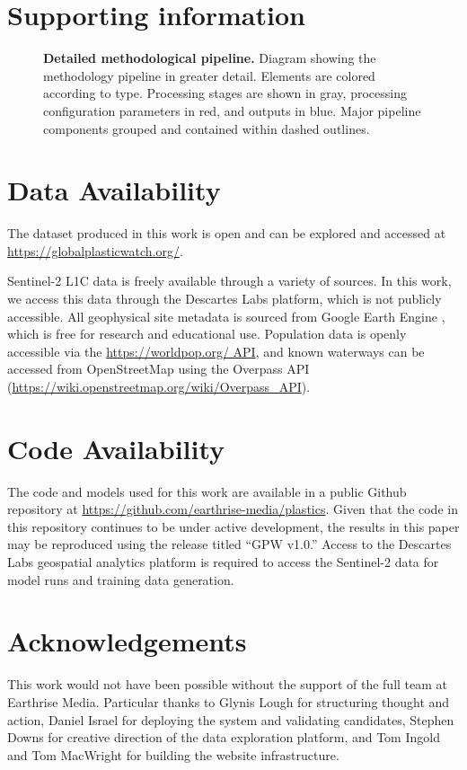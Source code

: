 \documentclass[10pt,letterpaper]{article}
\begin{document}
\section*{Supporting information}
\begin{figure}[!h]
    \caption{{\bf Detailed methodological pipeline.}
    Diagram showing the methodology pipeline in greater detail. Elements are colored according to type. Processing stages are shown in gray, processing configuration parameters in red, and outputs in blue. Major pipeline components grouped and contained within dashed outlines.}
    \label{sup:full_pipeline}
\end{figure}


\section*{Data Availability}
The dataset produced in this work is open and can be explored and accessed at \url{https://globalplasticwatch.org/}.

Sentinel-2 L1C data is freely available through a variety of sources. In this work, we access this data through the Descartes Labs platform, which is not publicly accessible. All geophysical site metadata is sourced from Google Earth Engine \cite{gorelick2017google}, which is free for research and educational use. Population data is openly accessible via the \url{https://worldpop.org/ API}, and known waterways can be accessed from OpenStreetMap using the Overpass API (\url{https://wiki.openstreetmap.org/wiki/Overpass_API}).

\section*{Code Availability}
The code and models used for this work are available in a public Github repository at \url{https://github.com/earthrise-media/plastics}. Given that the code in this repository continues to be under active development, the results in this paper may be reproduced using the release titled “GPW v1.0.” Access to the Descartes Labs geospatial analytics platform is required to access the Sentinel-2 data for model runs and training data generation.

\section*{Acknowledgements}
This work would not have been possible without the support of the full team at Earthrise Media. Particular thanks to Glynis Lough for structuring thought and action, Daniel Israel for deploying the system and validating candidates, Stephen Downs for creative direction of the data exploration platform, and Tom Ingold and Tom MacWright for building the website infrastructure.
\end{document}
